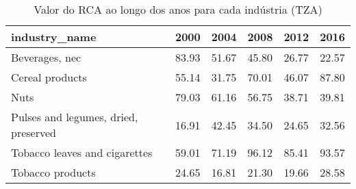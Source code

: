 \begin{table}
\centering
\caption{Valor do RCA ao longo dos anos para cada indústria (TZA)}
\begin{tabular}{p{6cm}p{1.5cm}p{1.5cm}p{1.5cm}p{1.5cm}p{1.5cm}}
\toprule
                       industry\_name &  2000 &  2004 &  2008 &  2012 &  2016 \\
\midrule
                      Beverages, nec & 83.93 & 51.67 & 45.80 & 26.77 & 22.57 \\
                     Cereal products & 55.14 & 31.75 & 70.01 & 46.07 & 87.80 \\
                                Nuts & 79.03 & 61.16 & 56.75 & 38.71 & 39.81 \\
Pulses and legumes, dried, preserved & 16.91 & 42.45 & 34.50 & 24.65 & 32.56 \\
       Tobacco leaves and cigarettes & 59.01 & 71.19 & 96.12 & 85.41 & 93.57 \\
                    Tobacco products & 24.65 & 16.81 & 21.30 & 19.66 & 28.58 \\
\bottomrule
\end{tabular}
\end{table}
